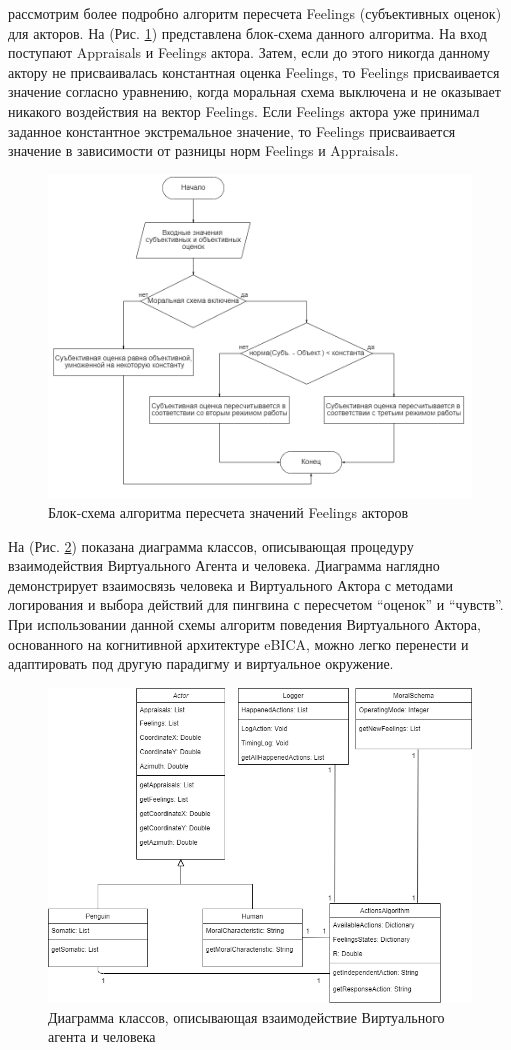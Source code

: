 рассмотрим более подробно алгоритм пересчета Feelings (субъективных оценок) для акторов. На (Рис. \ref{pic:oldcmodel1}) представлена блок-схема данного алгоритма. На вход поступают Appraisals и Feelings актора. 
Затем, если до этого никогда данному актору не присваивалась константная оценка Feelings, то Feelings присваивается значение согласно уравнению, 
когда моральная схема выключена и не оказывает никакого воздействия на вектор Feelings. 
Если Feelings актора уже принимал заданное константное экстремальное значение, то Feelings присваивается значение в зависимости от разницы норм Feelings и Appraisals.

\begin{figure}[h]
\includegraphics[width=0.75\columnwidth]{./img/oldcmodel1.png}
\centering
\caption{Блок-схема алгоритма пересчета значений Feelings акторов}
\label{pic:oldcmodel1}
\end{figure}

На (Рис. \ref{pic:oldcmodel2}) показана диаграмма классов, описывающая процедуру взаимодействия Виртуального Агента и человека. 
Диаграмма наглядно демонстрирует взаимосвязь человека и 
Виртуального Актора с методами логирования и выбора действий для пингвина с пересчетом “оценок” и “чувств”. 
При использовании данной схемы алгоритм поведения Виртуального Актора, основанного на когнитивной архитектуре eBICA, можно легко перенести и адаптировать 
под другую парадигму и виртуальное окружение.

\begin{figure}[h]
\includegraphics[width=0.75\columnwidth]{./img/oldcmodel2.png}
\centering
\caption{Диаграмма классов, описывающая взаимодействие Виртуального агента и человека}
\label{pic:oldcmodel2}
\end{figure}


